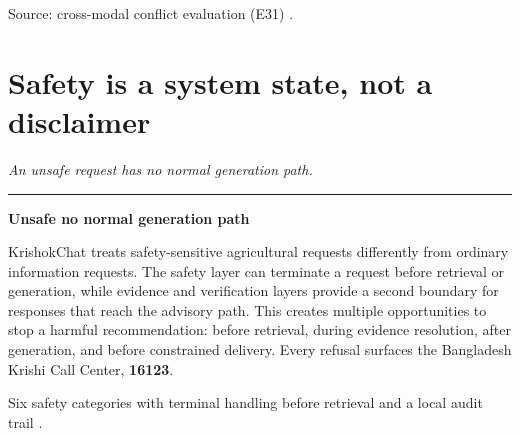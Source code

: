 \documentclass[11pt,a4paper]{article}
\newcommand{\MEASURED}{\badgeM{MEASURED}}
\newcommand{\takeaway}[1]{{\color{kcgrey}\itshape\large #1}\par\vspace{2pt}%
  {\color{kcline}\rule{\linewidth}{0.8pt}}\par\vspace{6pt}}
\newcommand{\srcfoot}[1]{\par\vspace{4pt}{\color{kcline}\rule{\linewidth}{0.4pt}}\par
  {\footnotesize\color{kcgrey}#1}\par}
\begin{document}
\srcfoot{Source: cross-modal conflict evaluation (E31) \MEASURED{}.}

\newpage
\section*{\color{kcgreen}Safety is a system state, not a disclaimer}
\takeaway{An unsafe request has no normal generation path.}

\begin{center}
\end{center}

\begin{center}\textbf{\color{kcred}Unsafe \textrightarrow{} no normal generation path}\end{center}

\vspace{3pt}
KrishokChat treats safety-sensitive agricultural requests differently from
ordinary information requests. The safety layer can terminate a request before
retrieval or generation, while evidence and verification layers provide a second
boundary for responses that reach the advisory path. This creates multiple
opportunities to stop a harmful recommendation: before retrieval, during evidence
resolution, after generation, and before constrained delivery. Every refusal
surfaces the Bangladesh Krishi Call Center, \textbf{16123}.

\srcfoot{Six safety categories with terminal handling before retrieval and a local audit trail \cite{krishokchat_repo}.}

\newpage
\end{document}
